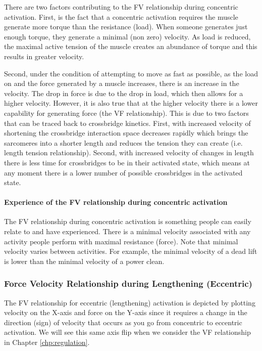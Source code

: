 There are two factors contributing to the FV relationship during concentric activation. First, is the fact that a concentric activation requires the muscle generate more torque than the resistance (load). When someone generates just enough torque, they generate a minimal (non zero) velocity. As load is reduced, the maximal active tension of the muscle creates an abundance of torque and this results in greater velocity. 

Second, under the condition of attempting to move as fast as possible, as the load on and the force generated by a muscle increases, there is an increase in the velocity. The drop in force is due to the drop in load, which then allows for a higher velocity. However, it is also true that at the higher velocity there is a lower capability for generating force (the VF relationship). This is due to two factors that can be traced back to crossbridge kinetics. First, with increased velocity of shortening the crossbridge interaction space decreases rapidly which brings the sarcomeres into a shorter length and reduces the tension they can create (i.e. length tension relationship). Second, with increased velocity of changes in length there is less time for crossbridges to be in their activated state, which means at any moment there is a lower number of possible crossbridges in the activated state. 

\paragraph{Experience of the FV relationship during concentric activation}
The FV relationship during concentric activation is something people can easily relate to and have experienced. There is a minimal velocity associated with any activity people perform with maximal resistance (force). Note that minimal velocity varies between activities.  For example, the minimal velocity of a dead lift is lower than the minimal velocity of a power clean. 


\subsubsection{Force Velocity Relationship during Lengthening (Eccentric)}

The FV relationship for eccentric (lengthening) activation is depicted by plotting velocity on the X-axis and force on the Y-axis since it requires a change in the direction (sign) of velocity that occurs as you go from concentric to eccentric activation. We will see this same axis flip when we consider the VF relationship in Chapter \ref{chp:regulation}.

